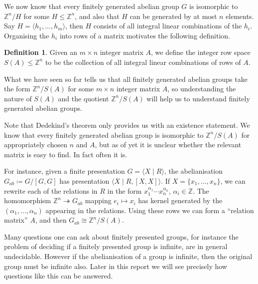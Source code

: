 \documentclass[12pt,a4paper]{article}
\newcommand{\Z}{\mathbb{Z}}
\theoremstyle{definition}
\newtheorem{definition}[theorem]{Definition}
\begin{document}
We now know that every finitely generated abelian group $G$ is isomorphic to $\Z^n/H$ for some $H\leq\Z^n$, and also that $H$ can be generated by at most $n$ elements. Say $H=\langle h_1,\ldots,h_m \rangle$, then $H$ consists of all integral linear combinations of the $h_i$. Organising the $h_i$ into rows of a matrix motivates the following definition.

\begin{definition}
  Given an $m\times n$ integer matrix $A$, we define the integer row space $S(A)\leq\Z^n$ to be the collection of all integral linear combinations of rows of $A$.
\end{definition}

What we have seen so far tells us that all finitely generated abelian groups take the form $\Z^n/S(A)$ for some $m\times n$ integer matrix $A$, so understanding the nature of $S(A)$ and the quotient $\Z^n/S(A)$ will help us to understand finitely generated abelian groups.

Note that Dedekind's theorem only provides us with an existence statement. We know that every finitely generated abelian group is isomorphic to $\Z^n/S(A)$ for appropriately chosen $n$ and $A$, but as of yet it is unclear whether the relevant matrix is easy to find. In fact often it is.

For instance, given a finite presentation $G=\langle X \mid R \rangle$, the abelianisation $G_{ab}\coloneqq G/[G,G]$ has presentation $\langle X \mid R, [X,X] \rangle$. If $X=\{x_1,\ldots,x_n\}$, we can rewrite each of the relations in $R$ in the form $x_1^{\alpha_1}\cdots x_n^{\alpha_n}$, $\alpha_i\in\Z$. The homomorphism $\Z^n\twoheadrightarrow G_{ab}$ mapping $e_i\mapsto x_i$ has kernel generated by the $(\alpha_1,\ldots,\alpha_n)$ appearing in the relations. Using these rows we can form a ``relation matrix'' $A$, and then $G_{ab}\cong\Z^n/S(A)$.

Many questions one can ask about finitely presented groups, for instance the problem of deciding if a finitely presented group is infinite, are in general undecidable. However if the abelianisation of a group is infinite, then the original group must be infinite also. Later in this report we will see precisely how questions like this can be answered.
\end{document}
